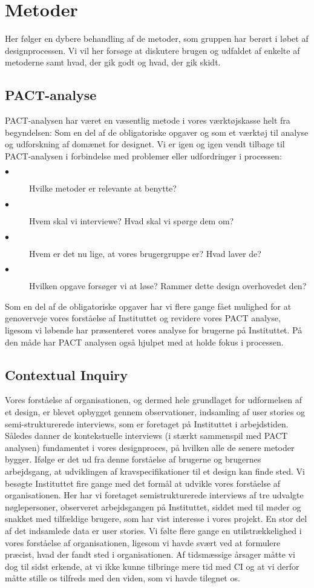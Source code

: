 \section{Metoder}
Her følger en dybere behandling af de metoder, som gruppen har berørt i løbet af designprocessen. Vi vil her forsøge at diskutere brugen og udfaldet af enkelte af metoderne samt hvad, der gik godt og hvad, der gik skidt.

\subsection{PACT-analyse}
PACT-analysen har været en væsentlig metode i vores værktøjskasse helt fra begyndelsen: Som en del af de obligatoriske opgaver og som et værktøj til analyse og udforskning af domænet for designet.
Vi er igen og igen vendt tilbage til PACT-analysen i forbindelse med problemer eller udfordringer i processen: 
\begin{description}
\item[$\bullet$] Hvilke metoder er relevante at benytte?
\item[$\bullet$] Hvem skal vi interviewe? Hvad skal vi spørge dem om?
\item[$\bullet$] Hvem er det nu lige, at vores brugergruppe er? Hvad laver de?
\item[$\bullet$] Hvilken opgave forsøger vi at løse? Rammer dette design overhovedet den?
\end{description}
Som en del af de obligatoriske opgaver har vi flere gange fået mulighed for at genoverveje vores forståelse af Instituttet og revidere vores PACT analyse, ligesom vi løbende har præsenteret vores analyse for brugerne på Instituttet. På den måde har PACT analysen også hjulpet med at holde fokus i processen.

\subsection{Contextual Inquiry}
Vores forståelse af organisationen, og dermed hele grundlaget for udformelsen af et design, er blevet opbygget gennem observationer, indsamling af user stories og semi-strukturerede interviews, som er foretaget på Instituttet i arbejdstiden. 
Således danner de kontekstuelle interviews (i stærkt sammenspil med PACT analysen) fundamentet i vores designproces, på hvilken alle de senere metoder bygger. Ifølge \citep{Benyon} er det ud fra denne forståelse af brugerne og brugernes arbejdsgang, at udviklingen af kravspecifikationer til et design kan finde sted.
Vi besøgte Instituttet fire gange med det formål at udvikle vores forståelse af organisationen. Her har vi foretaget semistrukturerede interviews af tre udvalgte nøglepersoner, observeret arbejdsgangen på Instituttet, siddet med til møder og snakket med tilfældige brugere, som har vist interesse i vores projekt. En stor del af det indsamlede data er user stories.
Vi følte flere gange en utilstrækkelighed i vores forståelse af organisationen, ligesom vi havde svært ved at formulere præcist, hvad der fandt sted i organisationen. Af tidsmæssige årsager måtte vi dog til sidst erkende, at vi ikke kunne tilbringe mere tid med CI og at vi derfor måtte stille os tilfreds med den viden, som vi havde tilegnet os. 


